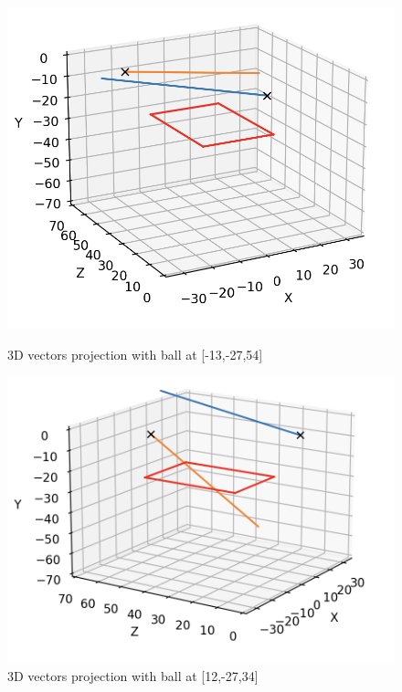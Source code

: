 \documentclass{article}
\begin{document}
\begin{figure}[h!]
\begin{minipage}[b]{0.5\linewidth}
    \vspace{4ex}
  \end{minipage} 
  \begin{minipage}[b]{0.5\linewidth}
    \centering
    \includegraphics[width=.2\textheight]{333.png} 
    \caption{\label{fig:333}3D vectors projection with ball at [-13,-27,54]} 
    \vspace{4ex}
  \end{minipage}%
  \begin{minipage}[b]{0.5\linewidth}
    \centering
    \includegraphics[width=.2\textheight]{444.png} 
    \caption{\label{fig:444}3D vectors projection with ball at [12,-27,34]} 
    \vspace{4ex}
  \end{minipage} 
\end{figure}
\end{document}

